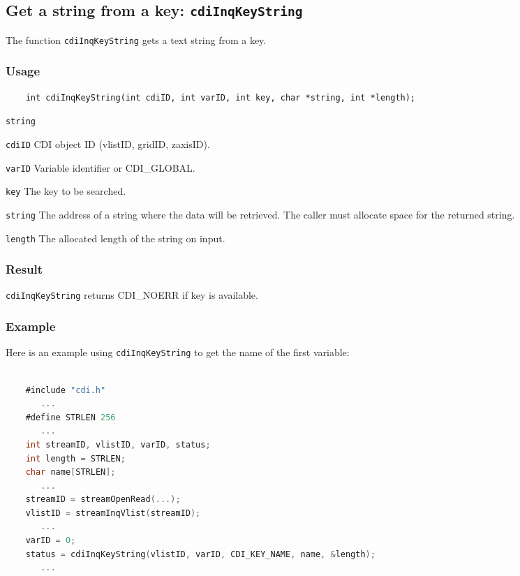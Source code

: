 \subsection{Get a string from a key: \texttt{cdiInqKeyString}}
\label{cdiInqKeyString}

The function {\texttt{cdiInqKeyString}} gets a text string from a key.

\subsubsection*{Usage}

\begin{verbatim}
    int cdiInqKeyString(int cdiID, int varID, int key, char *string, int *length);
\end{verbatim}

\hspace*{4mm}\begin{minipage}[]{15cm}
\begin{deflist}{\texttt{string}\ }
\item[\texttt{cdiID}]
CDI object ID (vlistID, gridID, zaxisID).
\item[\texttt{varID}]
Variable identifier or CDI\_GLOBAL.
\item[\texttt{key}]
The key to be searched.
\item[\texttt{string}]
The address of a string where the data will be retrieved.
                    The caller must allocate space for the returned string.
\item[\texttt{length}]
The allocated length of the string on input.
\end{deflist}
\end{minipage}

\subsubsection*{Result}

{\texttt{cdiInqKeyString}} returns CDI\_NOERR if key is available.


\subsubsection*{Example}

Here is an example using {\texttt{cdiInqKeyString}} to get the name of the first variable:

\begin{lstlisting}[language=C, backgroundcolor=\color{pyellow}, basicstyle=\small, columns=flexible]

    #include "cdi.h"
       ...
    #define STRLEN 256
       ...
    int streamID, vlistID, varID, status;
    int length = STRLEN;
    char name[STRLEN];
       ...
    streamID = streamOpenRead(...);
    vlistID = streamInqVlist(streamID);
       ...
    varID = 0;
    status = cdiInqKeyString(vlistID, varID, CDI_KEY_NAME, name, &length);
       ...
\end{lstlisting}


